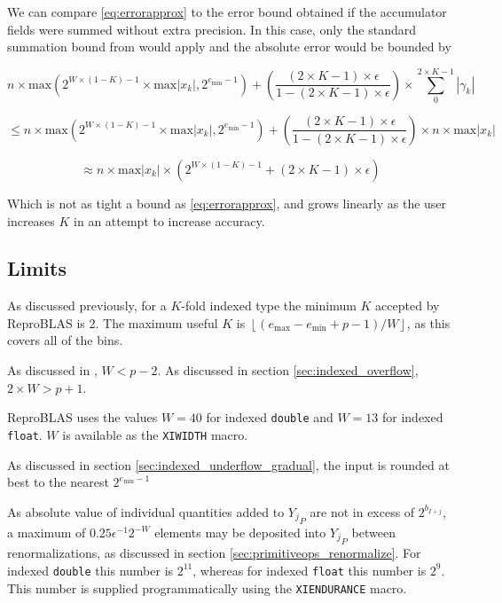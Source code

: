 \documentclass[12pt]{article}
\providecommand{\floor}[1]{\left \lfloor #1 \right \rfloor }
\providecommand{\min}{\ensuremath{\text{min}}}
\providecommand{\max}{\ensuremath{\text{max}}}
\theoremstyle{definition}
\numberwithin{equation}{section}
\numberwithin{figure}{section}
\begin{document}
    We can compare  \eqref{eq:errorapprox} to the error bound obtained if the accumulator fields were summed without extra precision. In this case, only the standard summation bound from \cite{higham} would apply and the absolute error would be bounded by

    \begin{equation*}
    n \times \max(2^{W \times (1 - K) - 1} \times \max|x_k|, 2^{e_{\min} - 1}) + (\frac{(2 \times K - 1) \times \epsilon}{1 - (2 \times K - 1) \times \epsilon}) \times \sum\limits_0^{2 \times K - 1}|\gamma_k|
    \end{equation*}

    \begin{equation*}
    \leq n \times \max(2^{W \times (1 - K) - 1} \times \max|x_k|, 2^{e_{\min} - 1}) + (\frac{(2 \times K - 1) \times \epsilon}{1 - (2 \times K - 1) \times \epsilon}) \times n \times \max|x_k|
    \end{equation*}

    \begin{equation}
    \approx n \times \max|x_k|\times (2^{W \times (1 - K) - 1} + (2 \times K - 1) \times \epsilon)
    \label{eq:baderrorapprox}
    \end{equation}

    Which is not as tight a bound as \eqref{eq:errorapprox}, and grows linearly as the user increases $K$ in an attempt to increase accuracy.

  \subsection{Limits}
    \label{sec:primitiveops_limits}
    As discussed previously, for a $K$-fold indexed type the minimum $K$ accepted by ReproBLAS is 2. The maximum useful $K$ is $\floor{(e_{\max} - e_{\min} + p - 1)/W}$, as this covers all of the bins.

    As discussed in \cite{repsum}, $W < p - 2$. As discussed in section \ref{sec:indexed_overflow}, $2\times W > p + 1$.

    ReproBLAS uses the values $W = 40$ for indexed \texttt{double} and $W = 13$ for indexed \texttt{float}. $W$ is available as the \texttt{XIWIDTH} macro.

    As discussed in section \ref{sec:indexed_underflow_gradual}, the input is rounded at best to the nearest $2^{e_{\min} - 1}$

    As absolute value of individual quantities added to ${Y_j}_P$ are not in excess of $2^{b_{I + j}}$, a maximum of $0.25\epsilon^{-1}2^{-W}$ elements may be deposited into ${Y_j}_P$ between renormalizations, as discussed in section \ref{sec:primitiveops_renormalize}. For indexed \texttt{double} this number is $2^{11}$, whereas for indexed \texttt{float} this number is $2^9$. This number is supplied programmatically using the \texttt{XIENDURANCE} macro.
\end{document}
